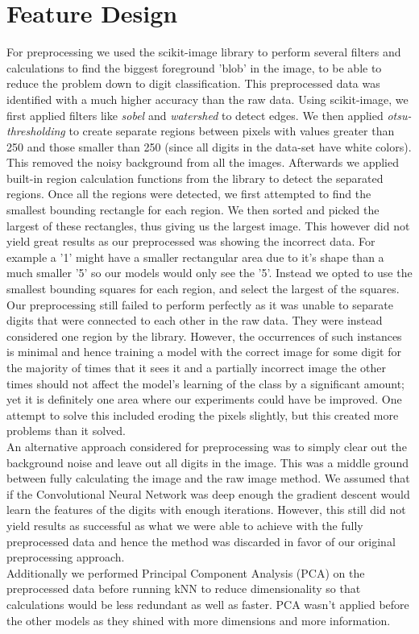 \documentclass[twoside,twocolumn]{article}
\begin{document}
\section{Feature Design}
For preprocessing we used the scikit-image \cite{SKIMAGE} library to perform several filters and calculations to find the biggest foreground 'blob' in the image, to be able to reduce the problem down to digit classification. This preprocessed data was identified with a much higher accuracy than the raw data. 
Using scikit-image, we first applied filters like \textit{sobel} and \textit{watershed} to detect edges. We then applied \textit{otsu-thresholding} to create separate regions between pixels with values greater than 250 and those smaller than 250 (since all digits in the data-set have white colors). This removed the noisy background from all the images. Afterwards we applied built-in region calculation functions from the library to detect the separated regions. Once all the regions were detected, we first attempted to find the smallest bounding rectangle for each region. We then sorted and picked the largest of these rectangles, thus giving us the largest image. This however did not yield great results as our preprocessed was showing the incorrect data. For example a '1' might have a smaller rectangular area due to it's shape than a much smaller '5' so our models would only see the '5'. Instead we opted to use the smallest bounding squares for each region, and select the largest of the squares. 
Our preprocessing still failed to perform perfectly as it was unable to separate digits that were connected to each other in the raw data. They were instead considered one region by the library. However, the occurrences of such instances is minimal and hence training a model with the correct image for some digit for the majority of times that it sees it and a partially incorrect image the other times should not affect the model's learning of the class by a significant amount; yet it is definitely one area where our experiments could have be improved. One attempt to solve this included eroding the pixels slightly, but this created more problems than it solved. \\
An alternative approach considered for preprocessing was to simply clear out the background noise and leave out all digits in the image. This was a middle ground between fully calculating the image and the raw image method. We assumed that if the Convolutional Neural Network was deep enough the gradient descent would learn the features of the digits with enough iterations. However, this still did not yield results as successful as what we were able to achieve with the fully preprocessed data and hence the method was discarded in favor of our original preprocessing approach. \\
Additionally we performed Principal Component Analysis (PCA) on the preprocessed data before running kNN to reduce dimensionality so that calculations would be less redundant as well as faster. PCA wasn't applied before the other models as they shined with more dimensions and more information.
\end{document}
